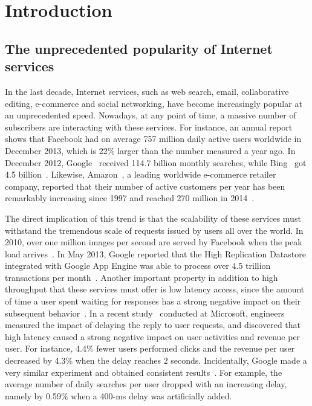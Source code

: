 \chapter{Introduction}
\label{chapter:intro}

\section{The unprecedented popularity of Internet services}
In the last decade, Internet services, such as web search, email, collaborative 
editing, e-commerce and social networking, have become
increasingly popular at an unprecedented speed. Nowadays, at any point of time, a massive number 
of subscribers are interacting with these services. For instance, an annual 
report~\cite{FB2013AnnualReport} shows that Facebook had on 
average 757 million daily active users worldwide in December 2013, which is 22\% 
larger than the number measured a year ago.  In December 2012, 
Google~\cite{GoogleWeb} received 114.7 billion monthly searches, while 
Bing~\cite{bing} got 4.5 billion~\cite{Sullivan2013Search}. Likewise, 
Amazon~\cite{AmazonWeb}, a leading worldwide e-commerce retailer
company, reported that their number of active customers per year has been 
remarkably increasing since 1997 and
reached 270 million in 2014~\cite{AmazonEcommerceStat}.

The direct implication of this trend is that the scalability of these services 
must withstand the tremendous scale of requests issued by users all over the 
world.  In 2010, over one million images per second are served by Facebook when 
the peak load arrives~\cite{Beaver2010Needle}. In May 2013, Google reported that 
the High Replication Datastore integrated with Google App Engine was able to 
process over 4.5 trillion transactions per 
month~\cite{Google2014CloudDataStore}. Another important property in addition to 
high throughput that these services must offer is low latency access, since the 
amount of time a user spent waiting for responses has a strong negative impact 
on
their subsequent behavior~\cite{WebPerformance, GoogleABTest, 
Schurman2009latency}. In a recent study~\cite{Schurman2009latency} conducted at 
Microsoft, engineers measured the impact of delaying the reply to user requests, 
and discovered that high latency caused a strong negative
impact on user activities and revenue per user. For instance, 4.4\% fewer users performed clicks
and the revenue per user decreased by 4.3\% when the delay reaches 2 
seconds. Incidentally, Google made a very
similar experiment and obtained consistent results~\cite{Schurman2009latency}. For example, the
average number of daily searches per user dropped with an increasing delay, namely by 0.59\% when
a 400-ms delay was artificially added.

